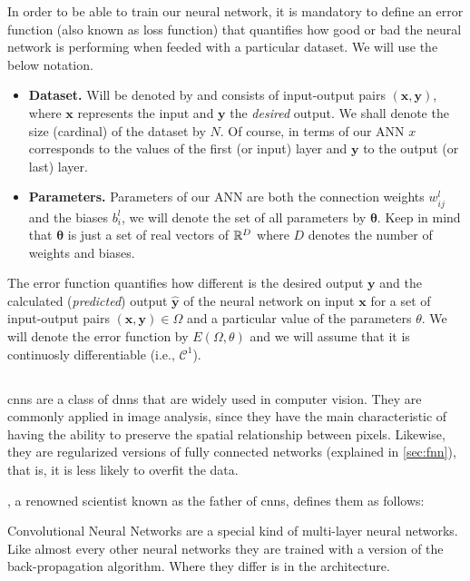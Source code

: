 In order to be able to train our neural network, it is mandatory to define an
error function (also known as loss function) that quantifies how good or bad
the neural network is performing when feeded with a particular dataset. We will
use the below notation.
\begin{itemize}
  \item \textbf{Dataset.} Will be denoted by and consists of input-output pairs
  \((\mathbf{x}, \mathbf{y})\), where \(\mathbf{x}\) represents the input and
  \(\mathbf{y}\) the \emph{desired} output. We shall denote the size (cardinal)
  of the dataset by \(N\). Of course, in terms of our ANN \(x\) corresponds to
  the values of the first (or input) layer and \(\mathbf{y}\) to the output (or
  last) layer.
  \item \textbf{Parameters.} Parameters of our ANN are both the connection
  weights \(w_{ij}^l\) and the biases \(b_i^l\), we will denote the set of all
  parameters by \(\bm{\theta}\). Keep in mind that \(\bm{\theta}\) is just a
  set of real vectors of \(\mathbb{R}^D\) where \(D\) denotes the number of weights and
  biases.
\end{itemize}

The error function quantifies how different is the desired output
\(\mathbf{y}\) and the calculated (\emph{predicted}) output
\(\mathbf{\hat{y}}\) of the neural network on input \(\mathbf{x}\) for a set of
input-output pairs \((\mathbf{x} , \mathbf{y}) \in \Omega\) and a particular
value of the parameters \(\theta\). We will denote the error function by
\(E (\Omega, \theta)\) and we will assume that it is continuosly differentiable
(i.e., \(\mathcal{C}^1\)).


\subsection{}%
\label{sec:conv-neur-netw}

\glspl{cnn} are a class of \glspl{dnn} that are widely used in computer
vision. They are commonly applied in image analysis, since they have the main
characteristic of having the ability to preserve the spatial relationship
between pixels. Likewise, they are regularized versions of fully connected
networks (explained in \vref{sec:fnn}), that is, it is less likely
to overfit the data.

, a renowned scientist known as the father of
\glspl{cnn}, defines them as follows:
\begin{quoteBox}
  Convolutional Neural Networks are a special kind of multi-layer neural
  networks. Like almost every other neural networks they are trained with a
  version of the back-propagation algorithm. Where they differ is in the
  architecture.
  \tcblower{}
\end{quoteBox}

